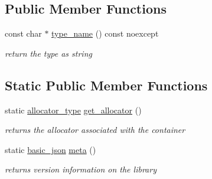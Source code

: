 \subsection*{Public Member Functions}
\begin{DoxyCompactItemize}
\item 
const char $\ast$ \mbox{\hyperlink{classnlohmann_1_1basic__json_a9d0a478571f82f0163b96b2424cd998f}{type\+\_\+name}} () const noexcept
\begin{DoxyCompactList}\small\item\em return the type as string \end{DoxyCompactList}\end{DoxyCompactItemize}
\subsection*{Static Public Member Functions}
\begin{DoxyCompactItemize}
\item 
\mbox{\label{classnlohmann_1_1basic__json_af4ac14224fbdd29d3547fcb11bb55c8f}} 
static \mbox{\hyperlink{classnlohmann_1_1basic__json_a86ce930490cf7773b26f5ef49c04a350}{allocator\+\_\+type}} \mbox{\hyperlink{classnlohmann_1_1basic__json_af4ac14224fbdd29d3547fcb11bb55c8f}{get\+\_\+allocator}} ()
\begin{DoxyCompactList}\small\item\em returns the allocator associated with the container \end{DoxyCompactList}\item 
static \mbox{\hyperlink{classnlohmann_1_1basic__json}{basic\+\_\+json}} \mbox{\hyperlink{classnlohmann_1_1basic__json_aef6d0eeccee7c5c7e1317c2ea1607fab}{meta}} ()
\begin{DoxyCompactList}\small\item\em returns version information on the library \end{DoxyCompactList}\end{DoxyCompactItemize}
